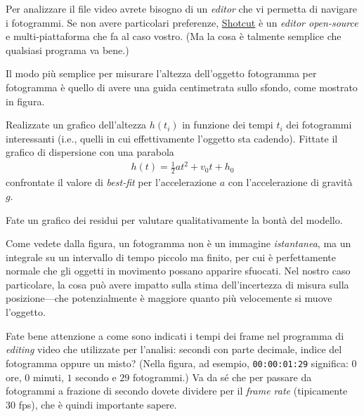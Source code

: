 \documentclass{lab1-article}
\begin{document}
\begin{article}

Per analizzare il file video avrete bisogno di un \emph{editor} che vi permetta
di navigare i fotogrammi. Se non avere particolari preferenze,
\href{https://shotcut.org/}{Shotcut} \`e un \emph{editor open-source} e
multi-piattaforma che fa al caso vostro. (Ma la cosa \`e talmente semplice che
qualsiasi programa va bene.)

Il modo pi\`u semplice per misurare l'altezza dell'oggetto fotogramma
per fotogramma \`e quello di avere una guida centimetrata sullo sfondo,
come mostrato in figura.



Realizzate un grafico dell'altezza $h(t_i)$ in funzione dei tempi $t_i$ dei
fotogrammi interessanti (i.e., quelli in cui effettivamente l'oggetto sta
cadendo). Fittate il grafico di dispersione con una parabola
\begin{align}
  h(t) = \frac{1}{2}at^2 + v_0 t + h_0
\end{align}
confrontate il valore di \emph{best-fit} per l'accelerazione $a$ con
l'accelerazione di gravit\`a $g$.

Fate un grafico dei residui per valutare qualitativamente la bont\`a del modello.


\secconsiderations

Come vedete dalla figura, un fotogramma non \`e un immagine \emph{istantanea},
ma un integrale su un intervallo di tempo piccolo ma finito, per cui \`e
perfettamente normale che gli oggetti in movimento possano apparire sfuocati.
Nel nostro caso particolare, la cosa pu\`o avere impatto sulla stima dell'incertezza
di misura sulla posizione---che potenzialmente \`e maggiore quanto pi\`u velocemente
si muove l'oggetto.

Fate bene attenzione a come sono indicati i tempi dei frame nel programma
di \emph{editing} video che utilizzate per l'analisi: secondi con parte decimale,
indice del fotogramma oppure un misto? (Nella figura, ad esempio,
\texttt{00:00:01:29} significa: $0$ ore, $0$ minuti, $1$ secondo e $29$ fotogrammi.)
Va da s\'e che per passare da fotogrammi a frazione di secondo dovete dividere
per il \emph{frame rate} (tipicamente 30 fps), che \`e quindi importante sapere.

\onecolumn




\end{article}
\end{document}
